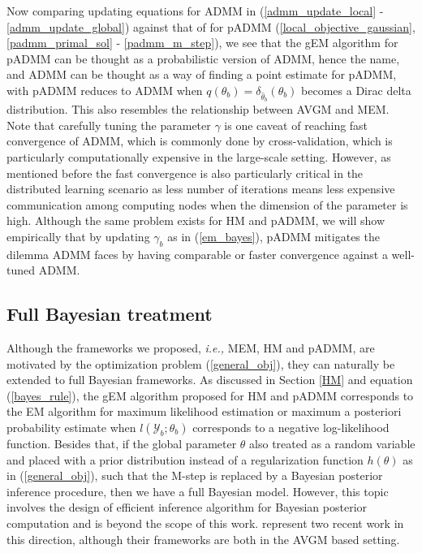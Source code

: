 \documentclass{article}
\newcommand{\ie}[0]{\emph{i.e., }}
\newcommand{\1}[0]{\ensuremath{\boldsymbol{1}}\xspace}
\begin{document}
Now comparing updating equations for ADMM in (\ref{admm_update_local} - \ref{admm_update_global}) against that of for pADMM (\ref{local_objective_gaussian}, \ref{padmm_primal_sol} - \ref{padmm_m_step}), we see that the gEM algorithm for pADMM can be thought as a probabilistic version of ADMM, hence the name, and ADMM can be thought as a way of finding a point estimate for pADMM, with pADMM reduces to ADMM when $q(\theta_b) = \delta_{\hat\theta_b}(\theta_b)$ becomes a Dirac delta distribution. This also resembles the relationship between AVGM and MEM. Note that carefully tuning the parameter $\gamma$ is one caveat of reaching fast convergence of ADMM, which is commonly done by cross-validation, which is particularly computationally expensive in the large-scale setting. However, as mentioned before the fast convergence is also particularly critical in the distributed learning scenario as less number of iterations means less expensive communication among computing nodes when the dimension of the parameter is high. Although the same problem exists for HM and pADMM, we will show empirically that by updating $\gamma_b$ as in (\ref{em_bayes}), pADMM mitigates the dilemma ADMM faces by having comparable or faster convergence against a well-tuned ADMM.


\subsection{Full Bayesian treatment}\label{Full_Bayesian}
Although the frameworks we proposed, \ie MEM, HM and pADMM, are motivated by the optimization problem (\ref{general_obj}), they can naturally be extended to full Bayesian frameworks. As discussed in Section \ref{HM} and equation (\ref{bayes_rule}), the gEM algorithm proposed for HM and pADMM corresponds to the EM algorithm for maximum likelihood estimation or maximum a posteriori probability estimate when $l(\mathcal{Y}_b; \theta_b)$ corresponds to a negative log-likelihood function. Besides that, if the global parameter $\theta$ also treated as a random variable and placed with a prior distribution instead of a regularization function $h(\theta)$ as in (\ref{general_obj}), such that the M-step is replaced by a Bayesian posterior inference procedure, then we have a full Bayesian model. However, this topic involves the design of efficient inference algorithm for Bayesian posterior computation and is beyond the scope of this work. \cite{Scott2013, Neiswanger2013} represent two recent work in this direction, although their frameworks are both in the AVGM based setting.
 
\end{document}
